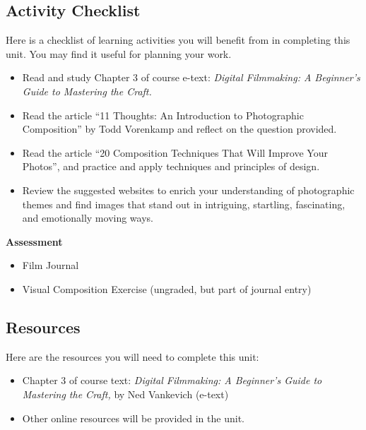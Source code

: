 \documentclass[
]{book}
\providecommand{\tightlist}{%
  \setlength{\itemsep}{0pt}\setlength{\parskip}{0pt}}
\begin{document}
\hypertarget{activity-checklist-2}{%
\subsection*{Activity Checklist}\label{activity-checklist-2}}

Here is a checklist of learning activities you will benefit from in completing this unit. You may find it useful for planning your work.

\begin{itemize}
\tightlist
\item
  Read and study Chapter 3 of course e-text: \emph{Digital Filmmaking: A Beginner's Guide to Mastering the Craft.}
\item
  Read the article ``11 Thoughts: An Introduction to Photographic Composition'' by Todd Vorenkamp and reflect on the question provided.
\item
  Read the article ``20 Composition Techniques That Will Improve Your Photos'', and practice and apply techniques and principles of design.
\item
  Review the suggested websites to enrich your understanding of photographic themes and find images that stand out in intriguing, startling, fascinating, and emotionally moving ways.
\end{itemize}

\textbf{Assessment}

\begin{itemize}
\tightlist
\item
  Film Journal\\
\item
  Visual Composition Exercise (ungraded, but part of journal entry)
\end{itemize}

\hypertarget{resources-2}{%
\subsection*{Resources}\label{resources-2}}

Here are the resources you will need to complete this unit:

\begin{itemize}
\tightlist
\item
  Chapter 3 of course text: \emph{Digital Filmmaking: A Beginner's Guide to Mastering the Craft,} by Ned Vankevich (e-text)
\item
  Other online resources will be provided in the unit.
\end{itemize}
\end{document}
